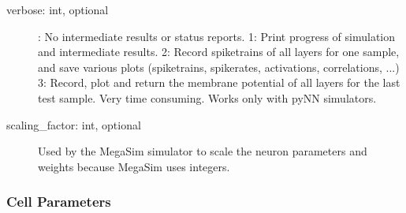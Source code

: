 \documentclass[letterpaper,10pt,english]{sphinxmanual}
\begin{document}
\begin{description}
\item[{verbose: int, optional}] : No intermediate results or status reports.
1: Print progress of simulation and intermediate results.
2: Record spiketrains of all layers for one sample, and save various plots
(spiketrains, spikerates, activations, correlations, ...)
3: Record, plot and return the membrane potential of all layers for the
last test sample. Very time consuming. Works only with pyNN simulators.

\item[{scaling\_factor: int, optional}] \leavevmode
Used by the MegaSim simulator to scale the neuron parameters and weights
because MegaSim uses integers.

\end{description}


\subsubsection{Cell Parameters}
\end{document}
